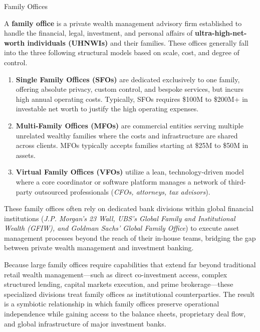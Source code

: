 \documentclass[10pt]{article}
\begin{document}
  \begin{core}{Family Offices}

    A \textbf{family office} is a private wealth management advisory firm established to handle the financial, legal, investment, and personal affairs of \textbf{ultra-high-net-worth individuals (UHNWIs)} and their families. These offices generally fall into the three following structural models based on scale, cost, and degree of control.

    \begin{enumerate}

      \item \textbf{Single Family Offices (SFOs)} are dedicated exclusively to one family, offering absolute privacy, custom control, and bespoke services, but incurs high annual operating costs. Typically, SFOs requires \$100M to \$200M+ in investable net worth to justify the high operating expenses.

      \item \textbf{Multi-Family Offices (MFOs)} are commercial entities serving multiple unrelated wealthy families where the costs and infrastructure are shared across clients. MFOs typically accepts families starting at \$25M to \$50M in assets.

      \item \textbf{Virtual Family Offices (VFOs)} utilize a lean, technology-driven model where a core coordinator or software platform manages a network of third-party outsourced professionals (\textit{CFOs, attorneys, tax advisors}).

    \end{enumerate}

    These family offices often rely on dedicated bank divisions within global financial institutions (\textit{J.P. Morgan's 23 Wall, UBS's Global Family and Institutional Wealth (GFIW), and Goldman Sachs' Global Family Office}) to execute asset management processes beyond the reach of their in-house teams, bridging the gap between private wealth management and investment banking.

    Because large family offices require capabilities that extend far beyond traditional retail wealth management---such as direct co-investment access, complex structured lending, capital markets execution, and prime brokerage---these specialized divisions treat family offices as institutional counterparties. The result is a symbiotic relationship in which family offices preserve operational independence while gaining access to the balance sheets, proprietary deal flow, and global infrastructure of major investment banks.

  \end{core}
\end{document}
